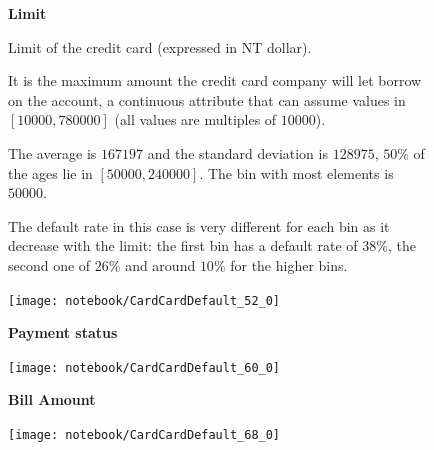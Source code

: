 \documentclass[11pt,a4paper]{report}
\begin{document}
\smallskip

\begin{figure}[h]
  \begin{minipage}[h]{.50\textwidth}
        {\Large \textbf{Limit}}
        
        Limit of the credit card (expressed in NT dollar).
        
        It is the maximum amount the credit card company will let borrow on the account, 
        a continuous attribute that can assume values in $[10000, 780000]$ (all values are multiples of $10000$).
        
        The average is $167197$ and the standard deviation is $128975$, $50\%$ of the ages lie in $[50000, 240000]$. The bin with most elements is $50000$.
        
        The default rate in this case is very different for each bin as it decrease with the limit: the first bin has a default rate of $38\%$, the second one of $26\%$ and around $10\%$ for the higher bins.
        
  \end{minipage}
  \begin{minipage}[h]{.45\textwidth}
    \texttt{[image: notebook/CardCardDefault\_52\_0]}
  \end{minipage}

\end{figure}

\clearpage

\smallskip
\begin{figure}[h]
  \begin{minipage}[h]{.40\textwidth}
        {\Large \textbf{Payment status}}
        

  \end{minipage}
  \begin{minipage}[h]{.60\textwidth}
    \texttt{[image: notebook/CardCardDefault\_60\_0]}
  \end{minipage}
\end{figure}

\smallskip
\begin{figure}[h]
  \begin{minipage}[h]{.40\textwidth}
        {\Large \textbf{Bill Amount}}
        

  \end{minipage}
  \begin{minipage}[h]{.60\textwidth}
    \texttt{[image: notebook/CardCardDefault\_68\_0]}
  \end{minipage}
\end{figure}
\end{document}
